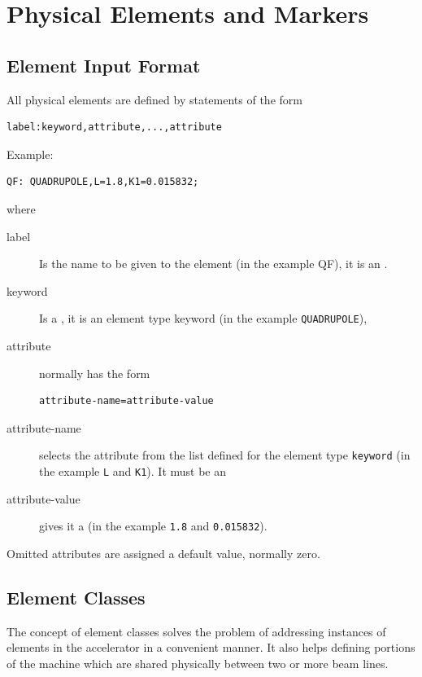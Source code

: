 \chapter{Physical Elements and Markers}
\label{sec:element}

\section{Element Input Format}
\label{sec:elm-format}
All physical elements are defined by statements of the form
\begin{verbatim}
label:keyword,attribute,...,attribute
\end{verbatim}
\noindent Example:
\begin{verbatim}
QF: QUADRUPOLE,L=1.8,K1=0.015832;
\end{verbatim}
where
\begin{description}
\item[label]
  Is the name to be given to the element (in the example QF),
  it is an .
\item[keyword]
  Is a ,
  it is an element type keyword (in the example \texttt{QUADRUPOLE}),
\item[attribute]
  normally has the form
\begin{verbatim}
attribute-name=attribute-value
\end{verbatim}
\item[attribute-name]
  selects the attribute from the list defined for the element type 
  \texttt{keyword} (in the example \texttt{L} and \texttt{K1}).
  It must be an  
\item[attribute-value]
  gives it a  
  (in the example \texttt{1.8} and \texttt{0.015832}).
\end{description}
Omitted attributes are assigned a default value, normally zero.


\section{Element Classes}
\label{sec:elm-class}
The concept of element classes solves the problem of addressing
instances of elements in the accelerator in a convenient manner.
It also helps defining portions of the machine which are shared
physically between two or more beam lines.

